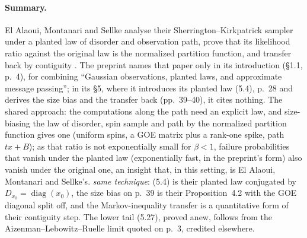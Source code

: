 \documentclass[11pt]{article}
\newcommand{\ploc}[2]{#1}
\newcommand{\sloc}[2]{\cite[#2]{#1}}
\newcommand{\rel}[1]{\textit{#1}}
\begin{document}
\paragraph{Summary.}
El Alaoui, Montanari and Sellke analyse their Sherrington--Kirkpatrick
sampler under a planted law of disorder and observation path, prove that its
likelihood ratio against the original law is the normalized partition
function, and transfer back by contiguity
\sloc{ElAlaouiMontanariSellke2022-SamplingSKAlgorithmicSL}{\S4.1, Prop.~4.2, pp.~10--12}.
The preprint names that paper only in its introduction
(\ploc{\S1.1, p.~4}{introduction.tex:118--120}), for combining ``Gaussian
observations, planted laws, and approximate message passing''; in its \S5,
where it introduces its planted law \ploc{(5.4), p.~28}{stability.tex:107--118}
and derives the size bias and the transfer back
(\ploc{pp.~39--40}{stability.tex:1022--1083}), it cites nothing.
The shared approach: the computations along the path need an explicit law,
and size-biasing the law of disorder, spin sample and path by the normalized
partition function gives one (uniform spins, a GOE matrix plus a
rank-one spike, path $tx+B$); as that ratio is not exponentially small for
$\beta<1$, failure probabilities that vanish under the planted law
(exponentially fast, in the preprint's form) also vanish under the original
one, an insight that, in this setting, is El Alaoui, Montanari and Sellke's.
\rel{same technique}: (5.4) is their planted law conjugated by
$D_{x_0}=\operatorname{diag}(x_0)$, the size bias on p.~39 is their
Proposition~4.2 with the GOE diagonal split off, and the Markov-inequality
transfer is a quantitative form of their contiguity step.
The lower tail \ploc{(5.27)}{stability.tex:1040--1065}, proved anew, follows
from the Aizenman--Lebowitz--Ruelle limit \cite{NL-AizenmanLebowitzRuelle1987}
quoted on \ploc{p.~3}{introduction.tex:53--56}, credited elsewhere.
\end{document}
